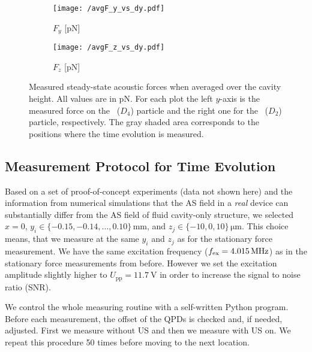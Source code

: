 \begin{figure}[H]
  \centering
  \begin{subfigure}{\figWidth}
    \centering
    \caption{$F_{y}$ [\si{\pico\newton}]}\label{subfig:TC-F_y}
    \texttt{[image: /avgF\_y\_vs\_dy.pdf]}
  \end{subfigure}%
  \begin{subfigure}{\figWidth}
    \centering
    \caption{$F_{z}$ [\si{\pico\newton}]}\label{subfig:TC-F_z}
    \texttt{[image: /avgF\_z\_vs\_dy.pdf]}
  \end{subfigure}%
  \caption{Measured steady-state acoustic forces when averaged over the cavity 
    height. All values are in \si{\pico\newton}. For each plot the left 
    $y$-axis is the measured force on the \Dfour~($D_{4}$) particle and the 
    right one for the \Dtwo~($D_{2}$) particle, respectively.
    The gray shaded area corresponds to the positions where the time evolution 
  is measured.}\label{fig:TC-averaged_forces_vs_dy}
\end{figure}

\subsection{Measurement Protocol for Time Evolution}

Based on a set of proof-of-concept experiments (data not shown here) and the 
information from numerical simulations that the AS field in a \emph{real} 
device can substantially differ from the AS field of fluid cavity-only 
structure, we selected $x = 0$, $y_{i} \in 
\{-0.15,-0.14,\dots,0.10\}\,\si{\mm}$, and $z_{j} \in \{-10,0,10\}\,\si{\um}$. 
This choice means, that we measure at the same $y_{i}$ and $z_{j}$ as for the 
stationary force measurement. We have the same excitation frequency ($\fex = 
\SI{4.015}{\MHz}$) as in the stationary force measurements from before. However 
we set the excitation amplitude slightly higher to $U_{\text{pp}} = 
\SI{11.7}{\volt}$ in order to increase the signal to noise ratio (SNR).

We control the whole measuring routine with a self-written Python program. 
Before each measurement, the offset of the QPDs is checked and, if needed, 
adjusted. First we measure without US and then we measure with US on. We repeat 
this procedure 50 times before moving to the next location.

